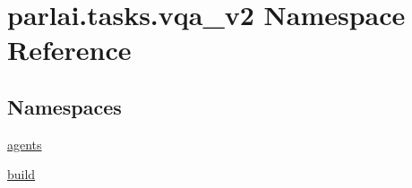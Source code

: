 \hypertarget{namespaceparlai_1_1tasks_1_1vqa__v2}{}\section{parlai.\+tasks.\+vqa\+\_\+v2 Namespace Reference}
\label{namespaceparlai_1_1tasks_1_1vqa__v2}
\subsection*{Namespaces}
\begin{DoxyCompactItemize}
\item 
 \hyperlink{namespaceparlai_1_1tasks_1_1vqa__v2_1_1agents}{agents}
\item 
 \hyperlink{namespaceparlai_1_1tasks_1_1vqa__v2_1_1build}{build}
\end{DoxyCompactItemize}
